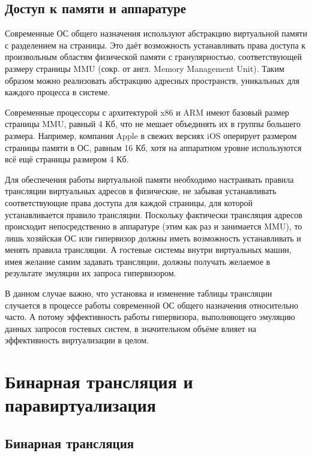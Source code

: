 \documentclass[14pt, a4paper]{article}
\begin{document}
\subsection*{Доступ к памяти и аппаратуре}

Современные ОС общего назначения используют абстракцию виртуальной памяти с разделением на
страницы. Это даёт возможность устанавливать права доступа к произвольным областям физической
памяти с гранулярностью, соответствующей размеру страницы MMU (сокр. от англ. Memory
Management Unit). Таким образом можно реализовать абстракцию адресных пространств, уникальных
для каждого процесса в системе.

Современные процессоры с архитектурой x86 и ARM имеют базовый размер страницы MMU, равный
4 Кб, что не мешает объединять их в группы большего размера. Например, компания Apple в свежих
версиях iOS оперирует размером страницы памяти в ОС, равным 16 Кб, хотя на аппаратном уровне
используются всё ещё страницы размером 4 Кб.

Для обеспечения работы виртуальной памяти необходимо настраивать правила трансляции
виртуальных адресов в физические, не забывая устанавливать соответствующие права доступа для
каждой страницы, для которой устанавливается правило трансляции. Поскольку фактически
трансляция адресов происходит непосредственно в аппаратуре (этим как раз и занимается MMU), то
лишь хозяйская ОС или гипервизор должны иметь возможность устанавливать и менять правила
трансляции. А гостевые системы внутри виртуальных машин, имея желание самим задавать
трансляции, должны получать желаемое в результате эмуляции их запроса гипервизором.

В данном случае важно, что установка и изменение таблицы трансляции случается в процессе
работы современной ОС общего назначения относительно часто. А потому эффективность работы
гипервизора, выполняющего эмуляцию данных запросов гостевых систем, в значительном объёме
влияет на эффективность виртуализации в целом.\newpage



\section*{Бинарная трансляция и паравиртуализация}

\subsection*{Бинарная трансляция}
\end{document}
